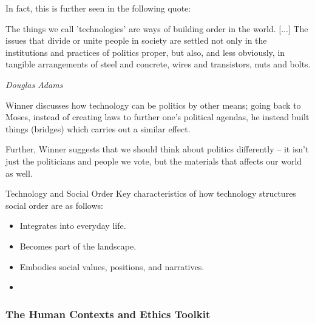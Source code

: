 \documentclass[openany]{book}
\begin{document}
In fact, this is further seen in the following quote:

\begin{fancyquotes}
	The things we call 'technologies' are ways of building order in the world. [...] The issues that divide or unite people in society are settled not only in the institutions and practices of politics proper, but also, and less obviously, in tangible arrangements of steel and concrete, wires and transistors, nuts and bolts.
	\begin{flushright}
		\emph{Douglas Adams}
	\end{flushright}
\end{fancyquotes}

Winner discusses how technology can be politics by other means; going back to Moses, instead of creating laws to further one's political agendas, he instead built things (bridges) which carries out a similar effect.

Further, Winner suggests that we should think about politics differently -- it isn't just the politicians and people we vote, but the materials that affects our world as well.

\begin{miscbox}{Technology and Social Order}
	Key characteristics of how technology structures social order are as follows:
	\begin{itemize}
		\item Integrates into everyday life.
		\item Becomes part of the landscape.
		\item Embodies social values, positions, and narratives.
		\item
	\end{itemize}
\end{miscbox}

\subsubsection{The Human Contexts and Ethics Toolkit}
%		
\end{document}
